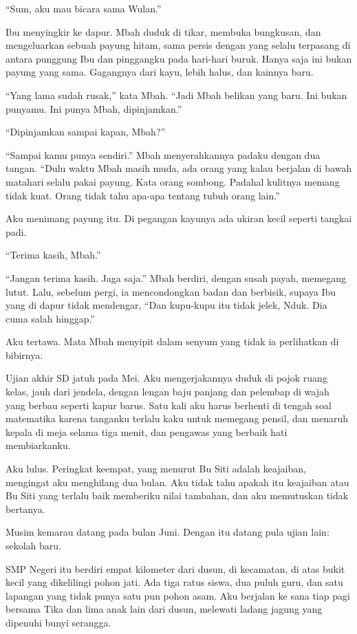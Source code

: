 \documentclass[11pt,twoside,openany]{book}
\makeatletter
\newcommand{\scenebreak}{\par\vspace{0.9em}{\centering\textsc{*\hspace{0.7em}*\hspace{0.7em}*}\par}\vspace{0.9em}\@afterindentfalse\@afterheading}
\makeatother
\begin{document}
``Sum, aku mau bicara sama Wulan.''

Ibu menyingkir ke dapur. Mbah duduk di tikar, membuka bungkusan, dan mengeluarkan sebuah payung hitam, sama persis dengan yang selalu terpasang di antara punggung Ibu dan pinggangku pada hari-hari buruk. Hanya saja ini bukan payung yang sama. Gagangnya dari kayu, lebih halus, dan kainnya baru.

``Yang lama sudah rusak,'' kata Mbah. ``Jadi Mbah belikan yang baru. Ini bukan punyamu. Ini punya Mbah, dipinjamkan.''

``Dipinjamkan sampai kapan, Mbah?''

``Sampai kamu punya sendiri.'' Mbah menyerahkannya padaku dengan dua tangan. ``Dulu waktu Mbah masih muda, ada orang yang kalau berjalan di bawah matahari selalu pakai payung. Kata orang sombong. Padahal kulitnya memang tidak kuat. Orang tidak tahu apa-apa tentang tubuh orang lain.''

Aku menimang payung itu. Di pegangan kayunya ada ukiran kecil seperti tangkai padi.

``Terima kasih, Mbah.''

``Jangan terima kasih. Jaga saja.'' Mbah berdiri, dengan susah payah, memegang lutut. Lalu, sebelum pergi, ia mencondongkan badan dan berbisik, supaya Ibu yang di dapur tidak mendengar, ``Dan kupu-kupu itu tidak jelek, Nduk. Dia cuma salah hinggap.''

Aku tertawa. Mata Mbah menyipit dalam senyum yang tidak ia perlihatkan di bibirnya.

\scenebreak
Ujian akhir SD jatuh pada Mei. Aku mengerjakannya duduk di pojok ruang kelas, jauh dari jendela, dengan lengan baju panjang dan pelembap di wajah yang berbau seperti kapur barus. Satu kali aku harus berhenti di tengah soal matematika karena tanganku terlalu kaku untuk memegang pensil, dan menaruh kepala di meja selama tiga menit, dan pengawas yang berbaik hati membiarkanku.

Aku lulus. Peringkat keempat, yang menurut Bu Siti adalah keajaiban, mengingat aku menghilang dua bulan. Aku tidak tahu apakah itu keajaiban atau Bu Siti yang terlalu baik memberiku nilai tambahan, dan aku memutuskan tidak bertanya.

Musim kemarau datang pada bulan Juni. Dengan itu datang pula ujian lain: sekolah baru.

\scenebreak
SMP Negeri itu berdiri empat kilometer dari dusun, di kecamatan, di atas bukit kecil yang dikelilingi pohon jati. Ada tiga ratus siswa, dua puluh guru, dan satu lapangan yang tidak punya satu pun pohon asam. Aku berjalan ke sana tiap pagi bersama Tika dan lima anak lain dari dusun, melewati ladang jagung yang dipenuhi bunyi serangga.
\end{document}
